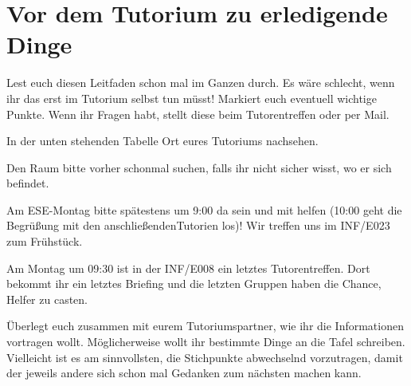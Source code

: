 \documentclass[a4paper,12pt]{report}
\begin{document}
\section{Vor dem Tutorium zu erledigende Dinge}
\begin{itemize*}
\item Lest euch diesen Leitfaden schon mal im Ganzen durch. Es wäre schlecht, wenn ihr das erst im Tutorium selbst tun müsst! Markiert euch eventuell wichtige Punkte. Wenn ihr Fragen habt, stellt diese beim Tutorentreffen oder per Mail.
\item In der unten stehenden Tabelle Ort eures Tutoriums nachsehen.
\item Den Raum bitte vorher schonmal suchen, falls ihr nicht sicher wisst, wo er sich befindet.
\item Am ESE-Montag bitte spätestens um 9:00 da sein und mit helfen (10:00 geht die Begrüßung mit den anschließendenTutorien los)! Wir treffen uns im INF/E023 zum Frühstück.
\item Am Montag um 09:30 ist in der INF/E008 ein letztes Tutorentreffen. Dort bekommt ihr ein letztes Briefing  und die letzten Gruppen haben die Chance, Helfer zu casten. 
\item Überlegt euch zusammen mit eurem Tutoriumspartner, wie ihr die Informationen vortragen wollt. Möglicherweise wollt ihr bestimmte Dinge an die Tafel schreiben. Vielleicht ist es am sinnvollsten, die Stichpunkte abwechselnd vorzutragen, damit der jeweils andere sich schon mal Gedanken zum nächsten machen kann.
\end{itemize*}
\end{document}
